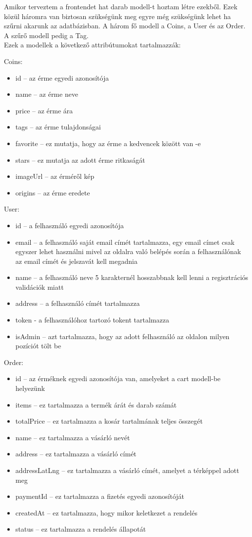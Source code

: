 Amikor terveztem a frontendet hat darab modell-t hoztam létre ezekből. Ezek közül háromra van biztosan szükségünk meg egyre még szükségünk lehet ha szűrni akarunk az adatbázisban. A három fő modell a Coins, a User és az Order. A szűrő modell pedig a Tag.\\

Ezek a modellek a következő attribútumokat tartalmazzák:

Coins:
\begin{itemize}
    \item id – az érme egyedi azonosítója
    \item name – az érme neve
    \item price – az érme ára
    \item tags – az érme tulajdonságai
    \item favorite – ez mutatja, hogy az érme a kedvencek között van -e
    \item stars – ez mutatja az adott érme ritkaságát
    \item imageUrl – az érméről kép
    \item origins – az érme eredete
\end{itemize}

User:
\begin{itemize}
    \item id – a felhasználó egyedi azonosítója
    \item email – a felhasználó saját email címét tartalmazza, egy email címet csak egyszer lehet használni mivel az oldalra való belépés során a felhasználónak az email címét és jelszavát kell megadnia
    \item name – a felhasználó neve 5 karakternél hosszabbnak kell lenni a regisztrációs validációk miatt
    \item address – a felhasználó címét tartalmazza
    \item token - a felhasználóhoz tartozó tokent tartalmazza
    \item isAdmin – azt tartalmazza, hogy az adott felhasználó az oldalon milyen pozíciót tölt be
\end{itemize}

Order:
\begin{itemize}
    \item id – az érméknek egyedi azonosítója van, amelyeket a cart modell-be helyezünk
    \item items – ez tartalmazza a termék árát és darab számát 
    \item totalPrice – ez tartalmazza a kosár tartalmának teljes összegét
    \item name – ez tartalmazza a vásárló nevét
    \item address – ez tartalmazza a vásárló címét
    \item addressLatLng – ez tartalmazza a vásárló címét, amelyet a térképpel adott meg
    \item paymentId – ez tartalmazza a fizetés egyedi azonosítóját
    \item createdAt – ez tartalmazza, hogy mikor keletkezet a rendelés
    \item status – ez tartalmazza a rendelés állapotát
\end{itemize}

